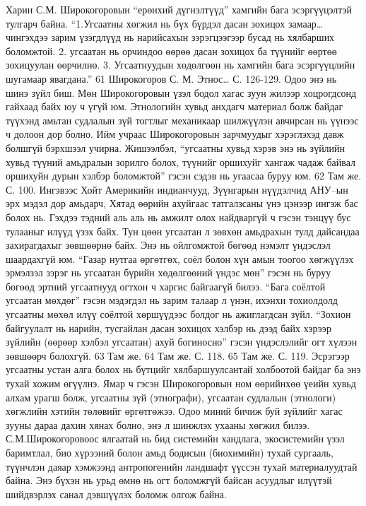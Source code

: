 Харин С.М. Широкогоровын “ерөнхий дүгнэлтүүд” хамгийн бага эсэргүүцэлтэй тулгарч байна. “1.Угсаатны хөгжил нь бүх бүрдэл дасан зохицох замаар…чингэхдээ зарим үзэгдлүүд нь нарийсахын зэрэгцээгээр бусад нь хялбарших боломжтой. 2. угсаатан нь орчиндоо өөрөө дасан зохицох ба түүнийг өөртөө зохицуулан өөрчилнө. 3. Угсаатнуудын хөдөлгөөн нь хамгийн бага эсэргүүцлийн шугамаар явагдана.”
61 Широкогоров С. М. Этнос… С. 126-129.
Одоо энэ нь шинэ зүйл биш. Мөн Широкогоровын үзэл бодол хагас зуун жилээр хоцрогдсонд гайхаад байх юу ч үгүй юм. Этнологийн хувьд анхдагч материал болж байдаг түүхэнд амьтан судлалын зүй тогтлыг механикаар шилжүүлэн авчирсан нь үүнээс ч долоон дор болно. Ийм учраас Широкогоровын зарчмуудыг хэрэглэхэд давж болшгүй бэрхшээл учирна. Жишээлбэл, “угсаатны хувьд хэрэв энэ нь зүйлийн хувьд түүний амьдралын зорилго болох, түүнийг оршихуйг хангаж чадаж байвал оршихуйн дурын хэлбэр боломжтой” гэсэн сэдэв нь угаасаа буруу юм. 62 Там же. С. 100.
Ингэвээс Хойт Америкийн индианчууд, Зүүнгарын нүүдэлчид АНУ–ын эрх мэдэл дор амьдарч, Хятад өөрийн ахуйгаас татгалзсаны үнэ цэнээр ингэж бас болох нь. Гэхдээ тэдний аль аль нь амжилт олох найдваргүй ч гэсэн тэнцүү бус тулааныг илүүд үзэх байх. Тун цөөн угсаатан л зөвхөн амьдрахын тулд дайсандаа захирагдахыг зөвшөөрнө байх. Энэ нь ойлгомжтой бөгөөд нэмэлт үндэслэл шаардахгүй юм. “Газар нутгаа өргөтгөх, соёл болон хүн амын тоогоо хөгжүүлэх эрмэлзэл зэрэг нь угсаатан бүрийн хөдөлгөөний үндэс мөн” гэсэн нь буруу бөгөөд эртний угсаатнууд огтхон ч харгис байгаагүй билээ. “Бага соёлтой угсаатан мөхдөг” гэсэн мэдэгдэл нь зарим талаар л үнэн, ихэнхи тохиолдолд угсаатны мөхөл илүү соёлтой хөршүүдээс болдог нь ажиглагдсан зүйл. “Зохион байгуулалт нь нарийн, тусгайлан дасан зохицох хэлбэр нь дээд байх хэрээр зүйлийн (өөрөөр хэлбэл угсаатан) ахуй богиносно” гэсэн үндэслэлийг огт хүлээн зөвшөөрч болохгүй.
63 Там же. 64 Там же. С. 118. 65 Там же. С. 119.
Эсрэгээр угсаатны устан алга болох нь бүтцийг хялбаршуулсантай холбоотой байдаг ба энэ тухай хожим өгүүлнэ. Ямар ч гэсэн Широкогоровын ном өөрийнхөө үеийн хувьд алхам урагш болж, угсаатны зүй (этнографи), угсаатан судлалын (этнологи) хөгжлийн хэтийн төлөвийг өргөтгөжээ. Одоо миний бичиж буй зүйлийг хагас зууны дараа дахин хянах болно, энэ л шинжлэх ухааны хөгжил билээ.
С.М.Широкогоровоос ялгаатай нь бид системийн хандлага, экосистемийн үзэл баримтлал, био хүрээний болон амьд бодисын (биохимийн) тухай сургааль, түүнчлэн даяар хэмжээнд антропогенийн ландшафт үүссэн тухай материалуудтай байна. Энэ бүхэн нь урьд өмнө нь огт боломжгүй байсан асуудлыг илүүтэй шийдвэрлэх санал дэвшүүлэх боломж олгож байна.
